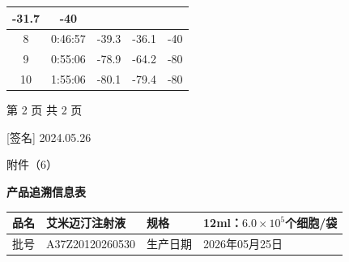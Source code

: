 \documentclass[UTF8,10pt,a4paper,fontset=fandol]{ctexart}
\newcommand{\fieldvalue}[1]{#1}
\newcommand{\handwritten}[1]{#1}
\begin{document}
\begin{tabularx}{0.55\textwidth}{|c|c|c|c|c|}
\fieldvalue{-31.7} &
\fieldvalue{-40} \\
\hline
\fieldvalue{8} &
\fieldvalue{0:46:57} &
\fieldvalue{-39.3} &
\fieldvalue{-36.1} &
\fieldvalue{-40} \\
\hline
\fieldvalue{9} &
\fieldvalue{0:55:06} &
\fieldvalue{-78.9} &
\fieldvalue{-64.2} &
\fieldvalue{-80} \\
\hline
\fieldvalue{10} &
\fieldvalue{1:55:06} &
\fieldvalue{-80.1} &
\fieldvalue{-79.4} &
\fieldvalue{-80} \\
\hline
\end{tabularx}

\vfill

\noindent 第 2 页 共 2 页

\hfill
\handwritten{[签名]}
\quad
\handwritten{2024.05.26}

\newpage

\handwritten{附件（6）}

\begin{center}
\textbf{产品追溯信息表}
\end{center}

\begin{tabularx}{\textwidth}{|l|X|l|X|}
\hline
品名 &
\fieldvalue{艾米迈汀注射液} &
规格 &
\fieldvalue{12ml：\(6.0\times10^{5}\)个细胞/袋} \\
\hline
批号 &
\fieldvalue{A37Z20120260530} &
生产日期 &
\fieldvalue{2026年05月25日} \\
\hline
\end{tabularx}
\end{document}
